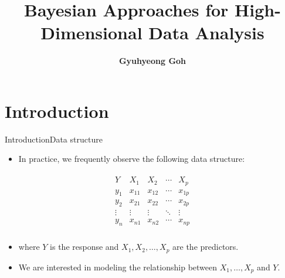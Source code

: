 \documentclass[citecolor=blue,10pt]{beamer}
\newcommand{\0} {\mbox{\boldmath$0$}}
\begin{document}
\title{Bayesian Approaches for High-Dimensional
Data Analysis}
\author{\bf Gyuhyeong Goh}


\date{}

\begin{frame}
\titlepage
\end{frame}


\section{Introduction}

\begin{frame}{Introduction}{Data structure}
\begin{itemize}
\item In practice, we frequently observe the following data structure: 
\end{itemize}

\begin{eqnarray*}
\begin{array}{c|c|c|c|c}
Y&X_1&X_2&\cdots &X_p\\
\hline
y_1& x_{11} & x_{12}&\cdots & x_{1p}  \\
y_2& x_{21} & x_{22}&\cdots & x_{2p} \\
\vdots& \vdots & \vdots&\ddots & \vdots \\
y_n& x_{n1} & x_{n2}&\cdots & x_{np} \\
\end{array}
\end{eqnarray*}
\begin{itemize}
\item[]\quad where $Y$ is the response and $X_1,X_2,\ldots, X_p$ are the predictors.
\item We are interested in modeling the relationship between $X_1,\ldots, X_p$ and $Y$.  
\end{itemize}
\end{frame}
\end{document}
